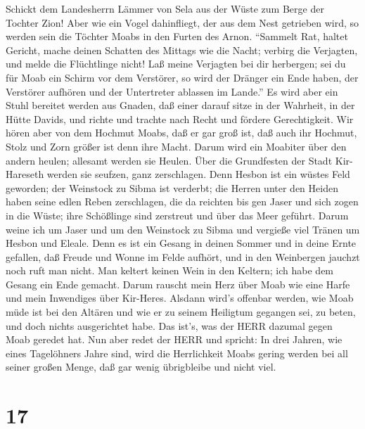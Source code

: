  Schickt dem Landesherrn Lämmer von Sela aus der Wüste zum
Berge der Tochter Zion!  Aber wie ein Vogel dahinfliegt, der
aus dem Nest getrieben wird, so werden sein die Töchter Moabs in den
Furten des Arnon.  ``Sammelt Rat, haltet Gericht, mache
deinen Schatten des Mittags wie die Nacht; verbirg die Verjagten, und
melde die Flüchtlinge nicht!  Laß meine Verjagten bei dir
herbergen; sei du für Moab ein Schirm vor dem Verstörer, so wird der
Dränger ein Ende haben, der Verstörer aufhören und der Untertreter
ablassen im Lande.''  Es wird aber ein Stuhl bereitet werden
aus Gnaden, daß einer darauf sitze in der Wahrheit, in der Hütte Davids,
und richte und trachte nach Recht und fördere Gerechtigkeit.
 Wir hören aber von dem Hochmut Moabs, daß er gar groß ist,
daß auch ihr Hochmut, Stolz und Zorn größer ist denn ihre Macht.
 Darum wird ein Moabiter über den andern heulen; allesamt
werden sie Heulen. Über die Grundfesten der Stadt Kir-Hareseth werden
sie seufzen, ganz zerschlagen.  Denn Hesbon ist ein wüstes
Feld geworden; der Weinstock zu Sibma ist verderbt; die Herren unter den
Heiden haben seine edlen Reben zerschlagen, die da reichten bis gen
Jaser und sich zogen in die Wüste; ihre Schößlinge sind zerstreut und
über das Meer geführt.  Darum weine ich um Jaser und um den
Weinstock zu Sibma und vergieße viel Tränen um Hesbon und Eleale. Denn
es ist ein Gesang in deinen Sommer und in deine Ernte gefallen,
 daß Freude und Wonne im Felde aufhört, und in den
Weinbergen jauchzt noch ruft man nicht. Man keltert keinen Wein in den
Keltern; ich habe dem Gesang ein Ende gemacht.  Darum
rauscht mein Herz über Moab wie eine Harfe und mein Inwendiges über
Kir-Heres.  Alsdann wird's offenbar werden, wie Moab müde
ist bei den Altären und wie er zu seinem Heiligtum gegangen sei, zu
beten, und doch nichts ausgerichtet habe.  Das ist's, was
der HERR dazumal gegen Moab geredet hat.  Nun aber redet
der HERR und spricht: In drei Jahren, wie eines Tagelöhners Jahre sind,
wird die Herrlichkeit Moabs gering werden bei all seiner großen Menge,
daß gar wenig übrigbleibe und nicht viel.

\hypertarget{section-16}{%
\section{17}\label{section-16}}

